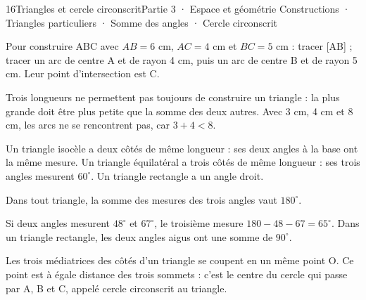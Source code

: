 \begin{ouverture}[geometrie]{16}{Triangles et cercle circonscrit}{Partie 3 · Espace et géométrie}
{Constructions · Triangles particuliers · Somme des angles · Cercle circonscrit}
\end{ouverture}
\pagestyle{otMain}\essentiel\fontsize{11}{15}\selectfont
{}\label{cours-16-1}
\begin{savoirfaire}Pour construire ABC avec $AB=6$ cm, $AC=4$ cm et $BC=5$ cm : tracer [AB] ; tracer un arc de centre A et de rayon 4 cm, puis un arc de centre B et de rayon 5 cm. Leur point d’intersection est C.\end{savoirfaire}
\label{fig-cours-16-1-cours-construction-triangle}

\begin{propriete}Trois longueurs ne permettent pas toujours de construire un triangle : la plus grande doit être plus petite que la somme des deux autres. Avec 3 cm, 4 cm et 8 cm, les arcs ne se rencontrent pas, car $3+4<8$.\end{propriete}
\begin{definition}Un triangle isocèle a deux côtés de même longueur : ses deux angles à la base ont la même mesure. Un triangle équilatéral a trois côtés de même longueur : ses trois angles mesurent $60^\circ$. Un triangle rectangle a un angle droit.\end{definition}
\clearpage
{}\label{cours-16-2}
\begin{propriete}Dans tout triangle, la somme des mesures des trois angles vaut $180^\circ$.\end{propriete}
\label{fig-cours-16-2-cours-somme-angles}

\begin{exemple}Si deux angles mesurent $48^\circ$ et $67^\circ$, le troisième mesure $180-48-67=65^\circ$. Dans un triangle rectangle, les deux angles aigus ont une somme de $90^\circ$.\end{exemple}
\begin{propriete}Les trois médiatrices des côtés d’un triangle se coupent en un même point O. Ce point est à égale distance des trois sommets : c’est le centre du cercle qui passe par A, B et C, appelé cercle circonscrit au triangle.\end{propriete}
\label{fig-cours-16-2-cours-cercle-circonscrit}


